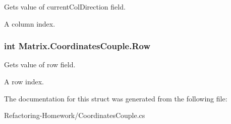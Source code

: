 Gets value of current\+Col\+Direction field. 

A column index.\hypertarget{struct_matrix_1_1_coordinates_couple_a669b16289a1ce293285abfa2f39bd00e}{
\subsubsection[{Row}]{\setlength{\rightskip}{0pt plus 5cm}int Matrix.\+Coordinates\+Couple.\+Row\hspace{0.3cm}{\ttfamily [get]}}}\label{struct_matrix_1_1_coordinates_couple_a669b16289a1ce293285abfa2f39bd00e}


Gets value of row field. 

A row index.

The documentation for this struct was generated from the following file\+:\begin{DoxyCompactItemize}
\item 
Refactoring-\/\+Homework/Coordinates\+Couple.\+cs\end{DoxyCompactItemize}
